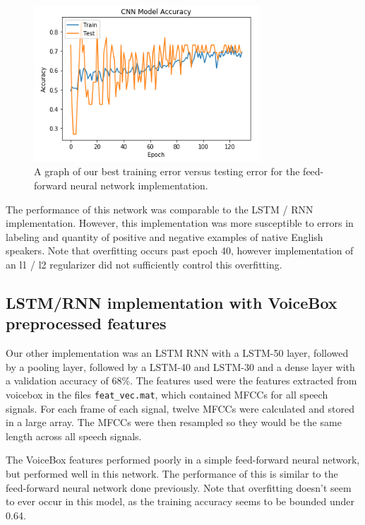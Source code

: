 \documentclass{article}
\begin{document}
\begin{figure}[htb]
	\centering
	\includegraphics[width = 8.5cm]{figs/best_ff_acc}
	\caption{A graph of our best training error versus testing error for the feed-forward neural network implementation.}
	\label{fig:best_ff}
\end{figure}

The performance of this network was comparable to the LSTM / RNN implementation.
However, this implementation was more susceptible to errors in labeling and quantity of positive and negative examples of native English speakers.
Note that overfitting occurs past epoch 40, however implementation of an  l1 / l2 regularizer did not sufficiently control this overfitting.

\subsection{LSTM/RNN implementation with VoiceBox preprocessed features}
\label{subsec:rnn}

Our other implementation was an LSTM RNN with a LSTM-50 layer, followed by a pooling layer, followed by a LSTM-40 and LSTM-30 and a dense layer with a validation accuracy of 68\%.
The features used were the features extracted from voicebox in the files \texttt{feat\_vec.mat}, which contained MFCCs for all speech signals.
For each frame of each signal, twelve MFCCs were calculated and stored in a large array.
The MFCCs were then resampled so they would be the same length across all speech signals.

The VoiceBox features performed poorly in a simple feed-forward neural network, but performed well in this network.
The performance of this is similar to the feed-forward neural network done previously.
Note that overfitting doesn’t seem to ever occur in this model, as the training accuracy seems to be bounded under 0.64.
\end{document}
